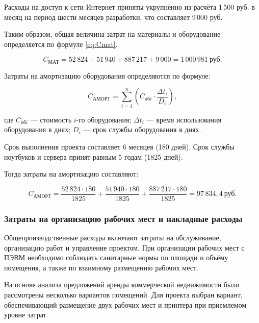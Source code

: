 Расходы на доступ к сети Интернет приняты укрупнённо из расчёта 1\,500 руб. в месяц на период шести месяцев разработки, что составляет 9\,000 руб.

Таким образом, общая величина затрат на материалы и оборудование определяется по формуле \eqref{eq:Cmat}.

\begin{equation}
C_{\text{МАТ}} = 52\,824 + 51\,940 + 887\,217 + 9\,000 = 1\,000\,981 \ \text{руб.}
\label{eq:Cmat}
\end{equation}

Затраты на амортизацию оборудования определяются по формуле:

\begin{equation}
C_{\text{АМОРТ}} = \sum_{i=1}^{n} \left( C_{\text{об}i} \cdot \frac{\Delta t_i}{D_i} \right),
\end{equation}

где $C_{\text{об}i}$ — стоимость $i$-го оборудования;  
$\Delta t_i$ — время использования оборудования в днях;  
$D_i$ — срок службы оборудования в днях.

Срок выполнения проекта составляет 6 месяцев (180 дней). Срок службы ноутбуков и сервера принят равным 5 годам (1825 дней).

Тогда затраты на амортизацию составляют:

$$
C_{\text{АМОРТ}} =
\frac{52\,824 \cdot 180}{1825} +
\frac{51\,940 \cdot 180}{1825} +
\frac{887\,217 \cdot 180}{1825}
= 97\,834{,}4 \ \text{руб.}
$$

\subsubsection{Затраты на организацию рабочих мест и накладные расходы}

Общепроизводственные расходы включают затраты на обслуживание, организацию работ и управление проектом. При организации рабочих мест с ПЭВМ необходимо соблюдать санитарные нормы по площади и объёму помещения, а также по взаимному размещению рабочих мест.

На основе анализа предложений аренды коммерческой недвижимости были рассмотрены несколько вариантов помещений. Для проекта выбран вариант, обеспечивающий размещение двух рабочих мест и принтера при приемлемом уровне затрат.

